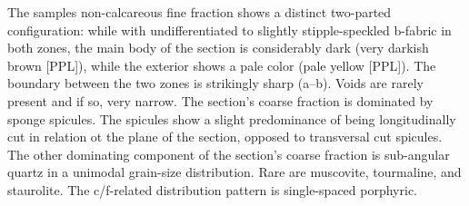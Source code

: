 \documentclass[a4paper]{article}
\begin{document}
\begin{multicols}{2}
\noindent The samples non-calcareous fine fraction shows a distinct two-parted configuration: while with undifferentiated to slightly stipple-speckled b-fabric in both zones, the main body of the section is considerably dark (very darkish brown [PPL]), while the exterior shows a pale color (pale yellow [PPL]). The boundary between the two zones is strikingly sharp (a--b). Voids are rarely present and if so, very narrow. The section's coarse fraction is dominated by sponge spicules. The spicules show a slight predominance of being longitudinally cut in relation ot the plane of the section, opposed to transversal cut spicules. The other dominating component of the section's coarse fraction is sub-angular quartz in a unimodal grain-size distribution. Rare are muscovite, tourmaline, and staurolite. The c/f-related distribution pattern is single-spaced porphyric.
\end{multicols}
\end{document}
